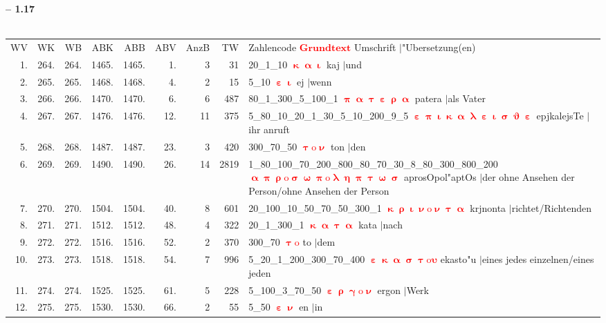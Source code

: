 \documentclass[a4paper,10pt,landscape]{article}
\begin{document}
\newpage 
{\bf -- 1.17}\\
\medskip \\
\begin{tabular}{rrrrrrrrp{120mm}}
WV&WK&WB&ABK&ABB&ABV&AnzB&TW&Zahlencode \textcolor{red}{$\boldsymbol{Grundtext}$} Umschrift $|$"Ubersetzung(en)\\
1.&264.&264.&1465.&1465.&1.&3&31&20\_1\_10 \textcolor{red}{$\boldsymbol{\upkappa\upalpha\upiota}$} kaj $|$und\\
2.&265.&265.&1468.&1468.&4.&2&15&5\_10 \textcolor{red}{$\boldsymbol{\upepsilon\upiota}$} ej $|$wenn\\
3.&266.&266.&1470.&1470.&6.&6&487&80\_1\_300\_5\_100\_1 \textcolor{red}{$\boldsymbol{\uppi\upalpha\uptau\upepsilon\uprho\upalpha}$} patera $|$als Vater\\
4.&267.&267.&1476.&1476.&12.&11&375&5\_80\_10\_20\_1\_30\_5\_10\_200\_9\_5 \textcolor{red}{$\boldsymbol{\upepsilon\uppi\upiota\upkappa\upalpha\uplambda\upepsilon\upiota\upsigma\upvartheta\upepsilon}$} epjkalejsTe $|$ihr anruft\\
5.&268.&268.&1487.&1487.&23.&3&420&300\_70\_50 \textcolor{red}{$\boldsymbol{\uptau\mathrm{o}\upnu}$} ton $|$den\\
6.&269.&269.&1490.&1490.&26.&14&2819&1\_80\_100\_70\_200\_800\_80\_70\_30\_8\_80\_300\_800\_200 \textcolor{red}{$\boldsymbol{\upalpha\uppi\uprho\mathrm{o}\upsigma\upomega\uppi\mathrm{o}\uplambda\upeta\uppi\uptau\upomega\upsigma}$} aprosOpol"aptOs $|$der ohne Ansehen der Person/ohne Ansehen der Person\\
7.&270.&270.&1504.&1504.&40.&8&601&20\_100\_10\_50\_70\_50\_300\_1 \textcolor{red}{$\boldsymbol{\upkappa\uprho\upiota\upnu\mathrm{o}\upnu\uptau\upalpha}$} krjnonta $|$richtet/Richtenden\\
8.&271.&271.&1512.&1512.&48.&4&322&20\_1\_300\_1 \textcolor{red}{$\boldsymbol{\upkappa\upalpha\uptau\upalpha}$} kata $|$nach\\
9.&272.&272.&1516.&1516.&52.&2&370&300\_70 \textcolor{red}{$\boldsymbol{\uptau\mathrm{o}}$} to $|$dem\\
10.&273.&273.&1518.&1518.&54.&7&996&5\_20\_1\_200\_300\_70\_400 \textcolor{red}{$\boldsymbol{\upepsilon\upkappa\upalpha\upsigma\uptau\mathrm{o}\upsilon}$} ekasto"u $|$eines jedes einzelnen/eines jeden \\
11.&274.&274.&1525.&1525.&61.&5&228&5\_100\_3\_70\_50 \textcolor{red}{$\boldsymbol{\upepsilon\uprho\upgamma\mathrm{o}\upnu}$} ergon $|$Werk\\
12.&275.&275.&1530.&1530.&66.&2&55&5\_50 \textcolor{red}{$\boldsymbol{\upepsilon\upnu}$} en $|$in\\

\end{tabular}
\end{document}
